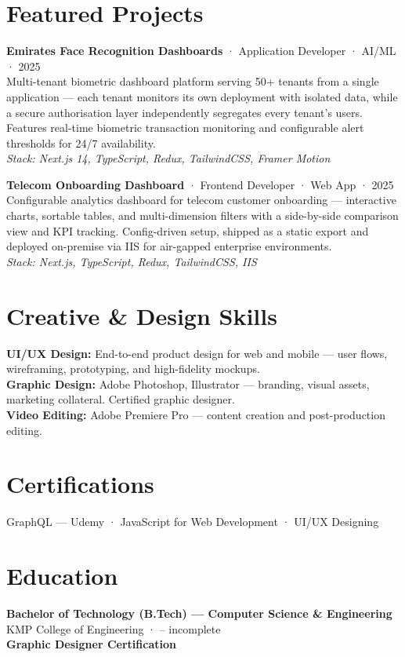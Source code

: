 \documentclass[a4paper,9.8pt]{article}
\newcommand{\projectentry}[4]{%
  {\bfseries #1} \textcolor{maroon}{·} {\small\color{maroon}#2}\\[2pt]
  {\small #3}\\[2pt]
  {\small\itshape\color{darkgray}Stack: #4}%
  \vspace{5pt}%
}
\begin{document}
\section{Featured Projects}

\projectentry
  {Emirates Face Recognition Dashboards}
  {Application Developer · AI/ML · 2025}
  {Multi-tenant biometric dashboard platform serving 50+ tenants from a single application — each tenant monitors its own deployment with isolated data, while a secure authorisation layer independently segregates every tenant's users. Features real-time biometric transaction monitoring and configurable alert thresholds for 24/7 availability.}
  {Next.js 14, TypeScript, Redux, TailwindCSS, Framer Motion}

\projectentry
  {Telecom Onboarding Dashboard}
  {Frontend Developer · Web App · 2025}
  {Configurable analytics dashboard for telecom customer onboarding — interactive charts, sortable tables, and multi-dimension filters with a side-by-side comparison view and KPI tracking. Config-driven setup, shipped as a static export and deployed on-premise via IIS for air-gapped enterprise environments.}
  {Next.js, TypeScript, Redux, TailwindCSS, IIS}

\section{Creative \& Design Skills}
{\small
\textbf{UI/UX Design:} End-to-end product design for web and mobile — user flows, wireframing, prototyping, and high-fidelity mockups.\\[2pt]
\textbf{Graphic Design:} Adobe Photoshop, Illustrator — branding, visual assets, marketing collateral. Certified graphic designer.\\[2pt]
\textbf{Video Editing:} Adobe Premiere Pro — content creation and post-production editing.
}

\section{Certifications}
{\small GraphQL — Udemy \quad · \quad JavaScript for Web Development \quad · \quad UI/UX Designing}

\section{Education}
{\small
\textbf{Bachelor of Technology (B.Tech) — Computer Science \& Engineering}\\
KMP College of Engineering \quad ·  – incomplete\\[2pt]
\textbf{Graphic Designer Certification}
}
\end{document}
